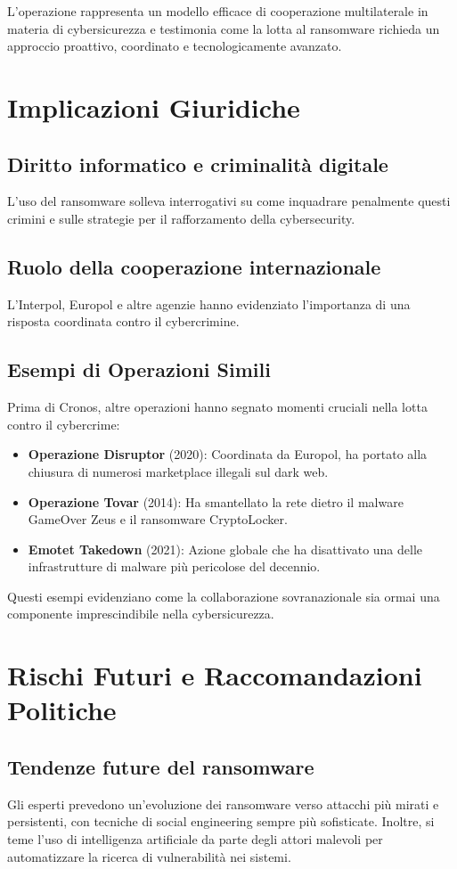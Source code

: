 \documentclass[a4paper,12pt]{article}
\begin{document}
L’operazione rappresenta un modello efficace di cooperazione multilaterale in materia di cybersicurezza e testimonia come la lotta al ransomware richieda un approccio proattivo, coordinato e tecnologicamente avanzato.

\section{Implicazioni Giuridiche}
\subsection{Diritto informatico e criminalità digitale}
L'uso del ransomware solleva interrogativi su come inquadrare penalmente questi crimini e sulle strategie per il rafforzamento della cybersecurity.

\subsection{Ruolo della cooperazione internazionale}
L'Interpol, Europol e altre agenzie hanno evidenziato l'importanza di una risposta coordinata contro il cybercrimine.

\subsection{Esempi di Operazioni Simili}
Prima di Cronos, altre operazioni hanno segnato momenti cruciali nella lotta contro il cybercrime:
\begin{itemize}
    \item \textbf{Operazione Disruptor} (2020): Coordinata da Europol, ha portato alla chiusura di numerosi marketplace illegali sul dark web.
    \item \textbf{Operazione Tovar} (2014): Ha smantellato la rete dietro il malware GameOver Zeus e il ransomware CryptoLocker.
    \item \textbf{Emotet Takedown} (2021): Azione globale che ha disattivato una delle infrastrutture di malware più pericolose del decennio.
\end{itemize}
Questi esempi evidenziano come la collaborazione sovranazionale sia ormai una componente imprescindibile nella cybersicurezza.

\section{Rischi Futuri e Raccomandazioni Politiche}
\subsection{Tendenze future del ransomware}
Gli esperti prevedono un’evoluzione dei ransomware verso attacchi più mirati e persistenti, con tecniche di social engineering sempre più sofisticate. Inoltre, si teme l’uso di intelligenza artificiale da parte degli attori malevoli per automatizzare la ricerca di vulnerabilità nei sistemi.
\end{document}
